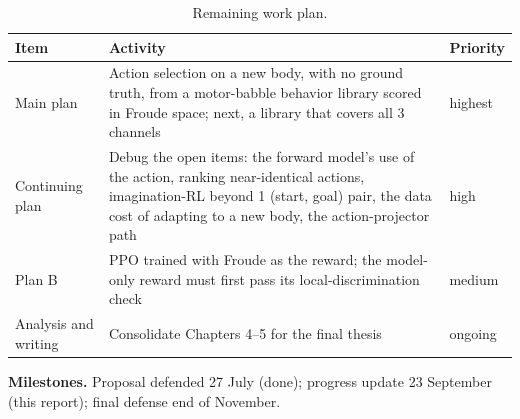 \documentclass[12pt,a4paper,oneside]{report}
\begin{document}
\begin{table}[H]
\centering
\small
\caption{Remaining work plan.}
\label{tab:plan}
\begin{tabularx}{\textwidth}{>{\hsize}Y>{\hsize}Y>{\hsize}Y}
\toprule
\textbf{Item} & \textbf{Activity} & \textbf{Priority}\\
\midrule
Main plan & Action selection on a new body, with no ground truth, from a motor-babble behavior library scored in Froude
  space; next, a library that covers all 3 channels & highest\\
\addlinespace[3pt]
Continuing plan & Debug the open items: the forward model's use of the action, ranking near-identical actions,
  imagination-RL beyond 1 (start, goal) pair, the data cost of adapting to a new body, the action-projector path &
  high\\
\addlinespace[3pt]
Plan B & PPO trained with Froude as the reward; the model-only reward must first pass its local-discrimination
  check & medium\\
\addlinespace[3pt]
Analysis and writing & Consolidate Chapters 4--5 for the final thesis & ongoing\\
\bottomrule
\end{tabularx}
\end{table}

\noindent\textbf{Milestones.} Proposal defended 27 July (done); progress update 23 September (this
report); final defense end of November.


\newcommand{\tlCell}[1]{\cellcolor{#1}}
\newcommand{\tlMileCell}[1]{\cellcolor{tlMile}\scriptsize\textbf{#1}}

\newcommand{\tlKey}[1]{\fcolorbox{black!55}{#1}{%
  \rule{0pt}{5pt}\rule{7pt}{0pt}}}
\end{document}
